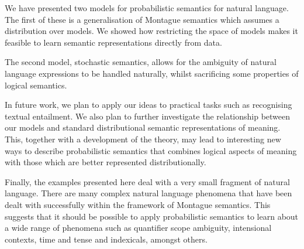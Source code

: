 \documentclass[11pt]{article}
\theoremstyle{definition}
\begin{document}
We have presented two models for probabilistic semantics for natural
language. The first of these is a generalisation of Montague semantics
which assumes a distribution over models. We showed how restricting
the space of models makes it feasible to learn semantic
representations directly from data.

The second model, stochastic semantics, allows for the ambiguity of
natural language expressions to be handled naturally, whilst
sacrificing some properties of logical semantics.




In future work, we plan to apply our ideas to practical tasks such as
recognising textual entailment.
We also plan to further investigate the relationship between our models and
standard distributional semantic representations of meaning. This,
together with a development of the theory, may lead to interesting
new ways to describe probabilistic semantics that combines logical
aspects of meaning with those which are better represented
distributionally.

Finally, the examples presented here deal with a very small fragment
of natural language. There are many complex natural language phenomena
that have been dealt with successfully within the framework of
Montague semantics. This suggests that it should be possible to apply
probabilistic semantics to learn about a wide range of phenomena such
as quantifier scope ambiguity, intensional contexts, time and tense
and indexicals, amongst others.





\end{document}

